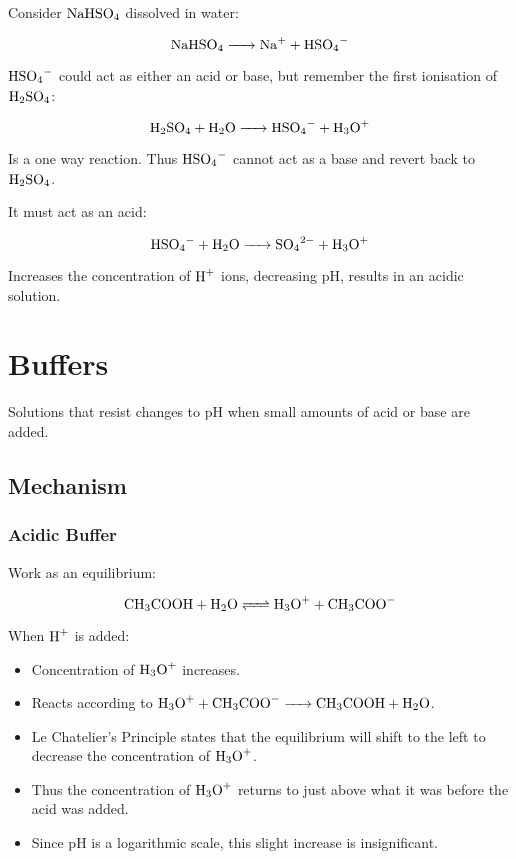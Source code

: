 \documentclass[a4paper,11pt]{article}
\begin{document}
Consider $\ce{NaHSO4}$ dissolved in water:

$$
\ce{NaHSO4 -> Na+ + HSO4-}
$$

$\ce{HSO4-}$ could act as either an acid or base, but remember the first
ionisation of $\ce{H2SO4}$:

$$
\ce{H2SO4 + H2O -> HSO4- + H3O+}
$$

Is a one way reaction. Thus $\ce{HSO4-}$ cannot act as a base and revert back
to $\ce{H2SO4}$.

It must act as an acid:

$$
\ce{HSO4- + H2O -> SO4^2- + H3O+}
$$

Increases the concentration of $\ce{H+}$ ions, decreasing pH, results in an
acidic solution.



\section{Buffers}

Solutions that resist changes to pH when small amounts of acid or base are
added.


\subsection{Mechanism}

\subsubsection{Acidic Buffer}

Work as an equilibrium:

$$
\ce{CH3COOH + H2O <=> H3O+ + CH3COO-}
$$

When $\ce{H+}$ is added:

\begin{itemize}
\item Concentration of $\ce{H3O+}$ increases.
\item Reacts according to $\ce{H3O+ + CH3COO- -> CH3COOH + H2O}$.
\item Le Chatelier's Principle states that the equilibrium will shift to the
	left to decrease the concentration of $\ce{H3O+}$.
\item Thus the concentration of $\ce{H3O+}$ returns to just above what it was
	before the acid was added.
\item Since pH is a logarithmic scale, this slight increase is insignificant.
\end{itemize}
\end{document}
